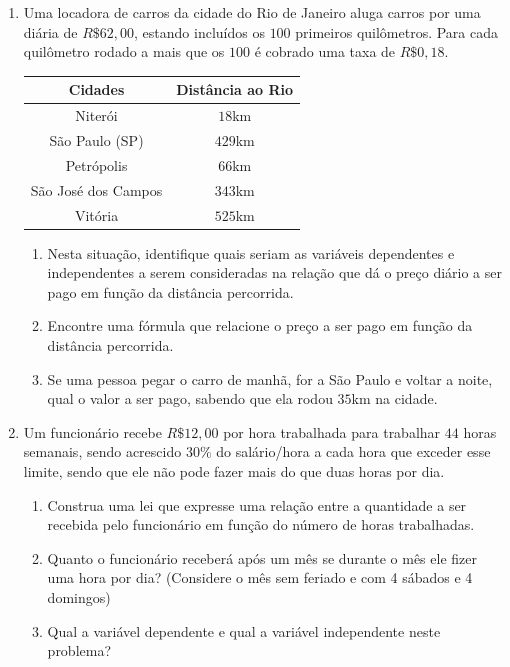 \documentclass[oneside,a4paper,12pt]{article}
\begin{document}
\begin{enumerate}
	\item Uma locadora de carros da cidade do Rio de Janeiro aluga carros por uma diária de $R\$62,00$, estando incluídos os $100$ primeiros quilômetros. Para cada quilômetro rodado a mais que os $100$ é cobrado uma taxa de $R\$0,18$.
	\begin{table}[h]
		\centering
		\begin{tabular}{|c|c|}
			\hline
			Cidades			&	Distância ao Rio \\
			\hline
			Niterói			&	$18$km	\\
			\hline
			São Paulo (SP)	&	$429$km	\\
			\hline	
			Petrópolis		&	$66$km	\\
			\hline
			São José dos Campos	& $343$km	\\
			\hline
			Vitória			&	$525$km	\\
			\hline
		\end{tabular}
	\end{table}
	\begin{enumerate}
		\item Nesta situação, identifique quais seriam as variáveis dependentes e independentes a serem consideradas na relação que dá o preço diário a ser pago em função da distância percorrida.
		\item Encontre uma fórmula que relacione o preço a ser pago em função da distância percorrida.
		\item Se uma pessoa pegar o carro de manhã, for a São Paulo e voltar a noite, qual o valor a ser pago, sabendo que ela rodou $35$km na cidade.
	\end{enumerate}


	\item Um funcionário recebe $R\$12,00$ por hora trabalhada para trabalhar $44$ horas semanais, sendo acrescido $30\%$ do salário/hora a cada hora que exceder esse limite, sendo que ele não pode fazer mais do que duas horas por dia.
	\begin{enumerate}
		\item Construa uma lei que expresse uma relação entre a quantidade a ser recebida pelo funcionário em função do número de horas trabalhadas.
		\item Quanto o funcionário receberá após um mês se durante o mês ele fizer uma hora por dia? (Considere o mês sem feriado e com 4 sábados e 4 domingos)
		\item Qual a variável dependente e qual a variável independente neste problema?
	\end{enumerate}


\end{enumerate}
\end{document}
